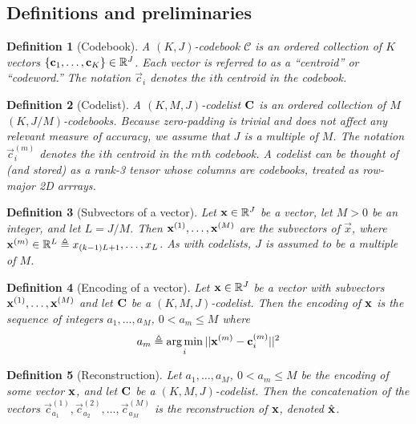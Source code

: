 \documentclass[]{article}
\newtheorem{definition}{Definition}[section]
\begin{document}
\subsection{Definitions and preliminaries}

\begin{definition}[Codebook]
A $(K, J)$-\textit{codebook} $\mathcal{C}$ is an ordered collection of $K$ vectors $\{\mathbf{c}_1,\ldots,\mathbf{c}_K\} \in \mathbb{R}^J$. Each vector is referred to as a ``centroid'' or ``codeword.'' The notation $\vec{c}_i$ denotes the $i$th centroid in the codebook.
\end{definition}

\begin{definition}[Codelist]
A $(K, M, J)$-codelist $\mathbf{C}$ is an ordered collection of $M$ $(K, J / M)$-codebooks. Because zero-padding is trivial and does not affect any relevant measure of accuracy, we assume that $J$ is a multiple of $M$. The notation $\vec{c}_i^{(m)}$ denotes the $i$th centroid in the $m$th codebook. A codelist can be thought of (and stored) as a rank-3 tensor whose columns are codebooks, treated as row-major 2D arrrays.
\end{definition}

\begin{definition}[Subvectors of a vector]
Let $\mathbf{x} \in \mathbb{R}^J$ be a vector, let $M > 0$ be an integer, and let $L = J / M$. Then $\mathbf{x}^{(1)},\ldots,\mathbf{x}^{(M)}$ are the subvectors of $\vec{x}$, where $\mathbf{x}^{(m)} \in \mathbb{R}^L \triangleq x_{(k-1)L + 1},\ldots,x_{L}$. As with codelists, $J$ is assumed to be a multiple of $M$.
\end{definition}

\begin{definition}[Encoding of a vector]
Let $\mathbf{x} \in \mathbb{R}^J$ be a vector with subvectors $\mathbf{x}^{(1)},\ldots,\mathbf{x}^{(M)}$ and let $\mathbf{C}$ be a $(K, M, J)$-codelist. Then the encoding of $\mathbf{x}$ is the sequence of integers $a_1,\ldots,a_M$, $0 < a_m \le M$ where
\begin{align}
    a_m \triangleq \operatorname*{arg\,min}_i ||\mathbf{x}^{(m)} - \mathbf{c}_{i}^{(m)}||^2
\end{align}
\end{definition}

\begin{definition}[Reconstruction]
Let $a_1,\ldots,a_M$, $0 < a_m \le M$ be the encoding of some vector $\mathbf{x}$, and let $\mathbf{C}$ be a $(K, M, J)$-codelist. Then the concatenation of the vectors $\vec{c}_{a_1}^{(1)},\vec{c}_{a_2}^{(2)},\ldots,\vec{c}_{a_M}^{(M)}$ is the reconstruction of $\mathbf{x}$, denoted $\hat{\mathbf{x}}$.
\end{definition}
\end{document}
